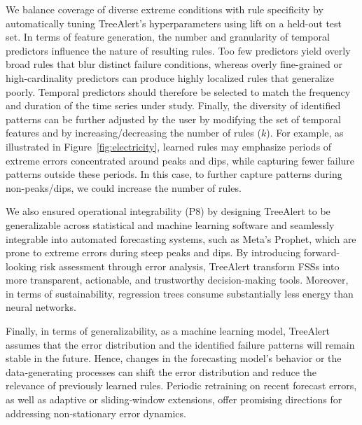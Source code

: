 \documentclass[12pt]{article}
\begin{document}
We balance coverage of diverse extreme conditions with rule specificity by automatically tuning TreeAlert's hyperparameters using lift on a held-out test set. In terms of feature generation, the number and granularity of temporal predictors influence the nature of resulting rules. Too few predictors yield overly broad rules that blur distinct failure conditions, whereas overly fine-grained or high-cardinality predictors can produce highly localized rules that generalize poorly. Temporal predictors should therefore be selected to match the frequency and duration of the time series under study. Finally, the diversity of identified patterns can be further adjusted by the user by modifying the set of temporal features and by increasing/decreasing the number of rules ($k$). For example, as illustrated in Figure~\ref{fig:electricity}, learned rules may emphasize periods of extreme errors concentrated around peaks and dips, while capturing fewer failure patterns outside these periods. In this case, to further capture patterns during non-peaks/dips, we could increase the number of rules.

We also ensured operational integrability (P8) by designing TreeAlert to be generalizable across statistical and machine learning software and seamlessly integrable into automated forecasting systems, such as Meta's Prophet, which are prone to extreme errors during steep peaks and dips. By introducing forward-looking risk assessment through error analysis, TreeAlert transform FSSs into more transparent, actionable, and trustworthy decision-making tools. Moreover, in terms of sustainability, regression trees consume substantially less energy than neural networks.

Finally, in terms of generalizability, as a machine learning model, TreeAlert assumes that the error distribution and the identified failure patterns will remain stable in the future. Hence, changes in the forecasting model's behavior or the data‑generating processes can shift the error distribution and reduce the relevance of previously learned rules. Periodic retraining on recent forecast errors, as well as adaptive or sliding‑window extensions, offer promising directions for addressing non‑stationary error dynamics.
\end{document}
